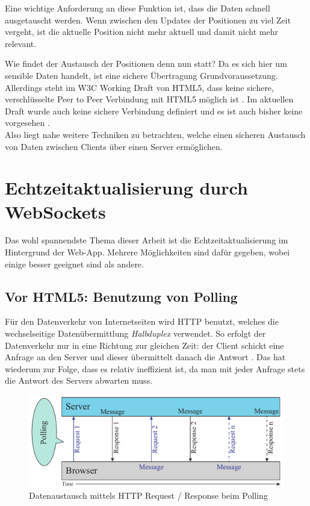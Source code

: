 Eine wichtige Anforderung an diese Funktion ist, dass die Daten schnell ausgetauscht werden. Wenn zwischen den Updates der Positionen zu viel Zeit vergeht, ist die aktuelle Position nicht mehr aktuell und damit nicht mehr relevant.\par

Wie findet der Austausch der Positionen denn nun statt? Da es sich hier um sensible Daten handelt, ist eine sichere Übertragung Grundvoraussetzung. Allerdings steht im W3C Working Draft von HTML5, dass keine sichere, verschlüsselte Peer to Peer Verbindung mit HTML5 möglich ist \cite{w3cworkingdraft}. Im aktuellen Draft wurde auch keine sichere Verbindung definiert und es ist auch bisher keine vorgesehen \cite{w3ccurrent}.\\
Also liegt nahe weitere Techniken zu betrachten, welche einen sicheren Austausch von Daten zwischen Clients über einen Server ermöglichen.

\section{Echtzeitaktualisierung durch WebSockets}
Das wohl spannendste Thema dieser Arbeit ist die Echtzeitaktualisierung im Hintergrund der Web-App. Mehrere Möglichkeiten sind dafür gegeben, wobei einige besser geeignet sind als andere.

\subsection{Vor HTML5: Benutzung von Polling}
Für den Datenverkehr von Internetseiten wird HTTP benutzt, welches die wechselseitige Datenübermittlung \emph{Halbduplex} verwendet. So erfolgt der Datenverkehr nur in eine Richtung zur gleichen Zeit: der Client schickt eine Anfrage an den Server und dieser übermittelt danach die Antwort \cite[S. 5]{ws}. Das hat wiederum zur Folge, dass es relativ ineffizient ist, da man mit jeder Anfrage stets die Antwort des Servers abwarten muss.\par

\begin{figure}[!ht]
	\centering
	\includegraphics[width=15cm]{fig/polling}
	\caption{Datenaustausch mittels HTTP Request / Response beim Polling {\cite[S. 7]{ws}}}
\end{figure}

